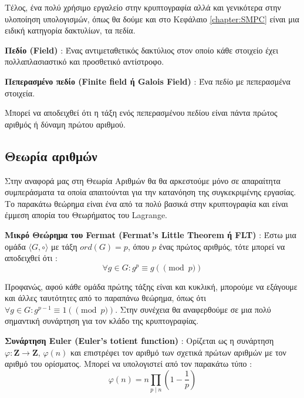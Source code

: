 Τέλος, ένα πολύ χρήσιμο εργαλείο στην κρυπτογραφία αλλά και γενικότερα στην υλοποίηση υπολογισμών, όπως θα δούμε και στο Κεφάλαιο \ref{chapter:SMPC} είναι μια ειδική κατηγορία δακτυλίων, τα πεδία.

\begin{definition}
\textbf{Πεδίο (Field)} : Ένας αντιμεταθετικός δακτύλιος στον οποίο κάθε στοιχείο έχει πολλαπλασιαστικό και προσθετικό αντίστροφο.
\end{definition}

\begin{definition}
\textbf{Πεπερασμένο πεδίο (Finite field ή Galois Field)} : Ένα πεδίο με πεπερασμένα στοιχεία.
\end{definition}

Μπορεί να αποδειχθεί ότι η τάξη ενός πεπερασμένου πεδίου είναι πάντα πρώτος αριθμός ή δύναμη πρώτου αριθμού. 

\subsection{Θεωρία αριθμών}

Στην αναφορά μας στη Θεωρία Αριθμών θα θα αρκεστούμε μόνο σε απαραίτητα συμπεράσματα τα οποία απαιτούνται για την κατανόηση της συγκεκριμένης εργασίας. Το παρακάτω θεώρημα είναι ένα από τα πολύ βασικά στην κρυπτογραφία και είναι έμμεση απορία του Θεωρήματος του Lagrange.

\begin{definition}
\textbf{Μικρό Θεώρημα του Fermat (Fermat's Little Theorem ή FLT)} :  Έστω μια ομάδα $\langle G, \circ \rangle$ με τάξη  $ord(G)=p$, όπου $p$ ένας πρώτος αριθμός, τότε μπορεί να αποδειχθεί ότι :
$$
\forall g \in G : g^{p} \equiv g (\pmod p)
$$
\end{definition}

Προφανώς, αφού κάθε ομάδα πρώτης τάξης είναι και κυκλική, μπορούμε να εξάγουμε και άλλες ταυτότητες από το παραπάνω θεώρημα, όπως ότι $\forall g \in G : g^{p-1} \equiv 1 (\pmod p)$. Στην συνέχεια θα αναφερθούμε σε μια πολύ σημαντική συνάρτηση για τον κλάδο της κρυπτογραφίας.

\begin{definition}
\textbf{Συνάρτηση Euler (Euler's totient function)} :  Ορίζεται ως η συνάρτηση $φ: \mathbf{Z} \rightarrow \mathbf{Z}$, $φ(n)$ και επιστρέφει τον αριθμό των σχετικά πρώτων αριθμών με τον αριθμό του ορίσματος. Μπορεί να υπολογιστεί από τον παρακάτω τύπο :
$$
φ(n)=n\prod_{p\mid n}\left(1-{\frac {1}{p}}\right)
$$
\end{definition}

